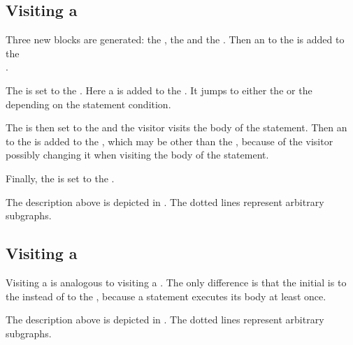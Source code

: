 \subsection{Visiting a }

Three new blocks are generated: the , the  and the . Then an
 to the  is added to the\\
.

The  is set to the . Here a  is added to the
. It jumps to either the  or the  depending on the 
statement condition.

The  is then set to the  and the visitor visits the body of the 
statement. Then an  to the  is added to the ,
which may be other than the , because of the visitor possibly changing it when visiting the body of the
 statement.

Finally, the  is set to the .

The description above is depicted in . The dotted lines represent arbitrary subgraphs.

\subsection{Visiting a }

Visiting a  is analogous to visiting a . The only difference is that
the initial  is to the  instead of to the ,
because a  statement executes its body at least once.

The description above is depicted in . The dotted lines represent arbitrary subgraphs.

